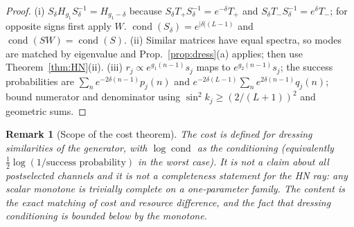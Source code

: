 \documentclass[11pt]{article}
\newtheorem{remark}{Remark}
\newcommand{\cond}{\operatorname{cond}}
\begin{document}
\begin{proof}
(i) $S_\delta H_{g_1}S_\delta^{-1}=H_{g_1-\delta}$ because $S_\delta T_+S_\delta^{-1}=e^{-\delta}T_+$ and $S_\delta T_-S_\delta^{-1}=e^{\delta}T_-$; for opposite signs first apply $W$. $\cond(S_\delta)=e^{|\delta|(L-1)}$ and $\cond(SW)=\cond(S)$. (ii) Similar matrices have equal spectra, so modes are matched by eigenvalue and Prop.~\ref{prop:dress}(a) applies; then use Theorem~\ref{thm:HN}(ii). (iii) $r_j\propto e^{g_1(n-1)}s_j$ maps to $e^{g_2(n-1)}s_j$; the success probabilities are $\sum_ne^{-2\delta(n-1)}p_j(n)$ and $e^{-2\delta(L-1)}\sum_ne^{2\delta(n-1)}q_j(n)$; bound numerator and denominator using $\sin^2k_j\ge(2/(L+1))^2$ and geometric sums.
\end{proof}
\begin{remark}[Scope of the cost theorem]
The cost is defined for dressing similarities of the generator, with $\log\cond$ as the conditioning (equivalently $\tfrac12\log(1/\text{success probability})$ in the worst case). It is not a claim about all postselected channels and it is not a completeness statement for the HN ray: any scalar monotone is trivially complete on a one-parameter family. The content is the exact matching of cost and resource difference, and the fact that dressing conditioning is bounded below by the monotone.
\end{remark}

\end{document}
